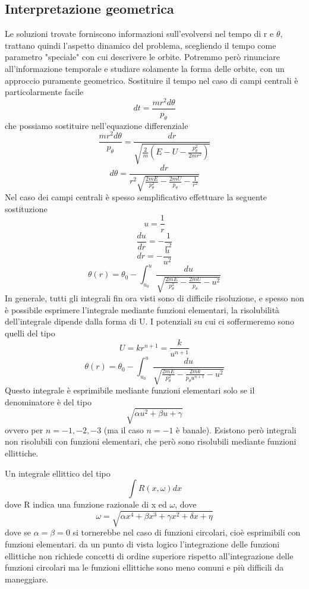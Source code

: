 \documentclass[
10pt, %
a4paper, %
oneside, %
headinclude,footinclude, %
BCOR5mm, %
]{scrartcl}
\begin{document}
\subsection{Interpretazione geometrica}
Le soluzioni trovate forniscono informazioni sull'evolversi nel tempo di r e $\theta$, trattano quindi l'aspetto dinamico del problema, scegliendo il tempo come parametro "speciale" con cui descrivere le orbite. Potremmo però rinunciare all'informazione temporale e studiare solamente la forma delle orbite, con un approccio puramente geometrico. Sostituire il tempo nel caso di campi centrali è particolarmente facile 
\[ dt= \frac{mr^2d\theta}{p_{\theta}}\]
che possiamo sostituire nell'equazione differenziale
\[\frac{mr^2d\theta}{p_{\theta}} = \frac{dr}{\sqrt{\frac{2}{m}\left(E-U-\frac{p_{\theta}^2 }{2mr^2}\right)}}\]
\[d\theta = \frac{dr}{r^2\sqrt{\frac{2mE}{p_{\theta}^2}-\frac{2mU}{p_{\theta}}-\frac{1}{r^2}}}\]
Nel caso dei campi centrali è spesso semplificativo effettuare la seguente sostituzione
\[u =  \frac{1}{r}\]
\[\frac{du}{dr} = -\frac{1}{r^2}\]
\[dr = -\frac{u}{u^2}\]
\[\theta(r) = \theta_0-\int^u_{u_0}\frac{du}{\sqrt{\frac{2mE}{p_{\theta}^2}-\frac{2mU}{p_{\theta}}-u^2}}\]
In generale, tutti gli integrali fin ora visti sono di difficile risoluzione, e spesso non è possibile esprimere l'integrale mediante funzioni elementari, la risolubilità dell'integrale dipende dalla forma di U. I potenziali su cui ci soffermeremo sono quelli del tipo
\[U = kr^{n+1} = \frac{k}{u^{n+1}}\]
\[\theta(r) = \theta_0-\int^u_{u_0}\frac{du}{\sqrt{\frac{2mE}{p_{\theta}^2}-\frac{2mk}{p_{\theta}u^{n+1}}-u^2}}\]
Questo integrale è esprimibile mediante funzioni elementari solo se il denominatore è del tipo 
\[\sqrt{\alpha u^2+\beta u + \gamma}\]
ovvero per \(n = -1, -2, -3\) (ma il caso \(n = -1\) è banale). Esistono però integrali non risolubili con funzioni elementari, che però sono risolubili mediante funzioni ellittiche.
\begin{definizione}
	Un integrale ellittico  del tipo
	\[\int R(x, \omega)dx\]
	dove R indica una funzione razionale di x ed \(\omega\), dove
	\[\omega = \sqrt{\alpha x^4+\beta x^3 + \gamma x^2 + \delta x + \eta}\]
	dove se $\alpha = \beta = 0$ si tornerebbe nel caso di funzioni circolari, cioè esprimibili con funzioni elementari. da un punto di vista logico l'integrazione delle funzioni ellittiche non richiede concetti di ordine superiore rispetto all'integrazione delle funzioni circolari ma le funzioni ellittiche sono meno comuni e più difficili da maneggiare. 
\end{definizione}
\end{document}
